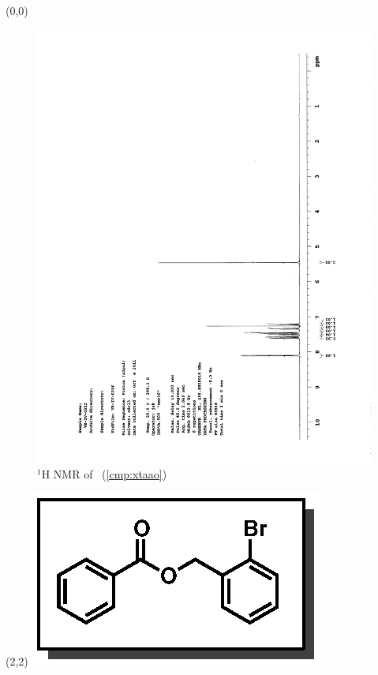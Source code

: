 \begin{textblock}{20}(0,0)
\begin{figure}[htb]
\caption{$^1$H NMR of \CMPxtaao\ (\ref{cmp:xtaao})}
\includegraphics[scale=0.75, trim = 0mm 0mm 0mm 5mm,
clip]{chp_asymmetric/images/nmr/xtaaoH}
\vspace{-100pt}
\end{figure}
\end{textblock}
\begin{textblock}{1}(2,2)
\includegraphics[scale=0.8, angle=90]{chp_asymmetric/images/xtaao}
\end{textblock}
